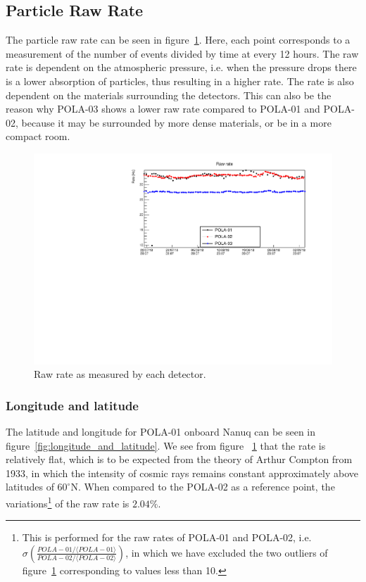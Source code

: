 \documentclass[12pt,a4paper]{amsart}
\begin{document}
\subsection{Particle Raw Rate}
The particle raw rate can be seen in figure~\ref{fig:RawRate}. Here, each point corresponds to a measurement of the number of events divided by time at every 12 hours. The raw rate is dependent on the atmospheric pressure, i.e. when the pressure drops there is a lower absorption of particles, thus resulting in a higher rate. The rate is also dependent on the materials surrounding the detectors. This can also be the reason why POLA-03 shows a lower raw rate compared to POLA-01 and POLA-02, because it may be surrounded by more dense materials, or be in a more compact room.

\begin{figure}
	\centering
	\includegraphics[width=\textwidth]{../data/plots/RawRate_all.pdf}
	\caption{Raw rate as measured by each detector.}
	\label{fig:RawRate}
\end{figure}

\subsubsection{Longitude and latitude}
The latitude and longitude for POLA-01 onboard Nanuq can be seen in figure~\ref{fig:longitude_and_latitude}. We see from figure ~\ref{fig:RawRate} that the rate is relatively flat, which is to be expected from the theory of Arthur Compton from 1933, in which the intensity of cosmic rays remains constant approximately above latitudes of $60^\circ$N. When compared to the POLA-02 as a reference point, the variations\footnote{This is performed for the raw rates of POLA-01 and POLA-02, i.e. $\sigma\left(\frac{POLA-01/\langle POLA-01\rangle}{POLA-02/\langle POLA-02 \rangle}\right)$, in which we have excluded the two outliers of figure~\ref{fig:RawRate} corresponding to values less than 10.} of the raw rate is $2.04\%$. 
\end{document}
